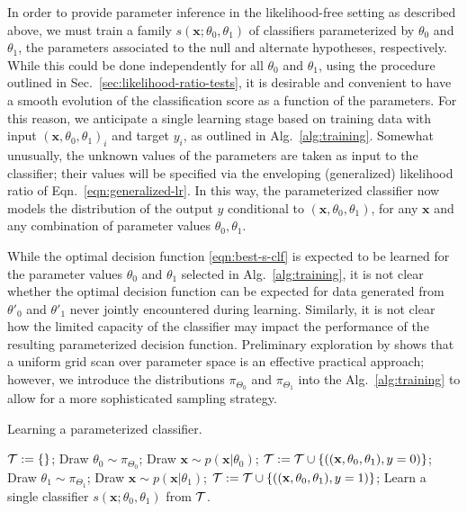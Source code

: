 \documentclass[12pt]{article}
\numberwithin{equation}{section}
\theoremstyle{plain}
\begin{document}
In order to provide parameter inference in the likelihood-free setting as
described above, we must train a family $s(\mathbf{x};\theta_0,\theta_1)$ of
classifiers parameterized by $\theta_0$ and $\theta_1$, the parameters
associated to the null and alternate hypotheses, respectively. While this could
be done independently for all $\theta_0$ and $\theta_1$, using the procedure
outlined in Sec.~\ref{sec:likelihood-ratio-tests}, it is desirable and
convenient to have a smooth evolution of the classification score as a function
of the parameters. For this reason, we anticipate a single learning stage based
on training data with input $(\mathbf{x}, \theta_0, \theta_1)_i$ and target
$y_i$, as outlined in Alg.~\ref{alg:training}. Somewhat unusually, the
unknown values of the parameters are taken as input to the classifier; their
values will be specified via the enveloping (generalized) likelihood ratio of
Eqn.~\ref{eqn:generalized-lr}.  In this way, the parameterized classifier
now models the distribution of the output $y$ conditional to $(\mathbf{x}, \theta_0, \theta_1)$,
for any $\mathbf{x}$ and any combination of parameter values $\theta_0, \theta_1$.

While the optimal decision function \ref{eqn:best-s-clf} is expected to be
learned for the parameter values $\theta_0$ and $\theta_1$ selected in
Alg.~\ref{alg:training}, it is not clear whether the optimal decision
function can be expected for data generated from  $\theta'_0$ and $\theta'_1$
never jointly encountered during learning. Similarly, it is not clear how the
limited capacity of the classifier may impact the performance of the resulting
parameterized decision function.
Preliminary exploration by \cite{Baldi:2016fzo} shows that
 a uniform grid scan over parameter space is an effective practical approach;
 however, we introduce the distributions $\pi_{\Theta_0}$ and $\pi_{\Theta_1}$
into the Alg.~\ref{alg:training} to allow for a more
 sophisticated sampling strategy.


\begin{algorithm}[t]
\caption{Learning a parameterized classifier.}\label{alg:training}
\begin{algorithmic}
    \State ${\cal T := \{ \}}$;
        \State Draw $\theta_0 \sim \pi_{\Theta_0}$;
	    \State Draw $\mathbf{x} \sim p(\mathbf{x}|\theta_0)$;
		\State ${\cal T} := {\cal T} \cup \{ ((\mathbf{x}, \theta_0, \theta_1), y=0) \}$;
        \State Draw $\theta_1 \sim \pi_{\Theta_1}$;
		\State Draw $\mathbf{x} \sim p(\mathbf{x}|\theta_1)$;
		\State ${\cal T} := {\cal T} \cup \{ ((\mathbf{x}, \theta_0, \theta_1), y=1) \}$;
    \EndWhile
    \State Learn a single classifier $s(\mathbf{x}; \theta_0, \theta_1)$ from ${\cal T}$.
\end{algorithmic}
\end{algorithm}
\end{document}
